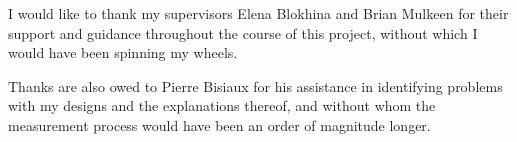 I would like to thank my supervisors Elena Blokhina and Brian Mulkeen for their support and guidance throughout the course of this project, without which I would have been spinning my wheels. 

Thanks are also owed to Pierre Bisiaux for his assistance in identifying problems with my designs and the explanations thereof, and without whom the measurement process would have been an order of magnitude longer.